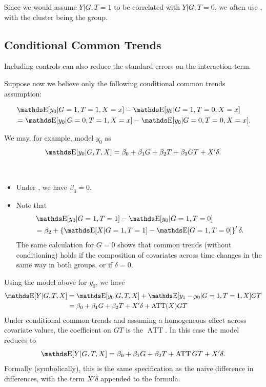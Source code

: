 \documentclass[letterpaper, 10pt]{article}
\DeclareMathOperator{\ATT}{ATT}
\begin{document}
\begin{remark}
  Since we would assume \(Y|G, T = 1\) to be correlated with \(Y|G, T = 0\), we often use , with the cluster being the group.
\end{remark}

\subsection{Conditional Common Trends}
\begin{remark}
  Including controls can also reduce the standard errors on the interaction term.
\end{remark}

Suppose now we believe only the following conditional common trends assumption:
\begin{assumption}\label{as:DiD-CCT}
  \begin{align*}
    &\E[y_0|G = 1, T = 1, X = x] - \E[y_0|G = 1, T = 0, X = x] \\
    &= \E[y_0|G = 0, T = 1, X = x] - \E[y_0|G = 0, T = 0, X = x].
  \end{align*}
\end{assumption}

We may, for example, model \(y_0\) as
\[
  \E[y_0|G, T, X]
  = \beta_0 + \beta_1 G + \beta_2 T + \beta_3 GT + X' \delta.
\]
\begin{remark}~
\begin{itemize}
  \item Under , we have \(\beta_3 = 0\).
  \item Note that
    \begin{align*}
      &\E[y_0| G = 1, T = 1] - \E[y_0| G = 1, T = 0] \\
      &= \beta_2 + \left\{ \E[X|G = 1, T = 1] - \E[G = 1, T = 0] \right\}' \delta.
    \end{align*}
    The same calculation for \(G = 0\) shows that common trends (without conditioning) holds if the composition of covariates across time changes in the same way in both groups, or if \(\delta = 0\).
\end{itemize}
\end{remark}

Using the model above for \(y_0\), we have
\begin{align*}
  \E[Y|G, T, X]
  &= \E[y_0|G, T, X] + \E[y_1 - y_0|G = 1, T = 1, X] GT \\
  &= \beta_0 + \beta_1 G + \beta_2 T + X' \delta + \ATT(X) GT
\end{align*}
Under conditional common trends and assuming a homogeneous effect across covariate values, the coefficient on \(GT\) is the \(\ATT\).
In this case the model reduces to
\[
  \E[Y|G, T, X]
  = \beta_0 + \beta_1 G + \beta_2 T + \ATT GT + X' \delta.
\]
Formally (symbolically), this is the same specification as the naive difference in differences, with the term \(X' \delta\) appended to the formula.
\end{document}
